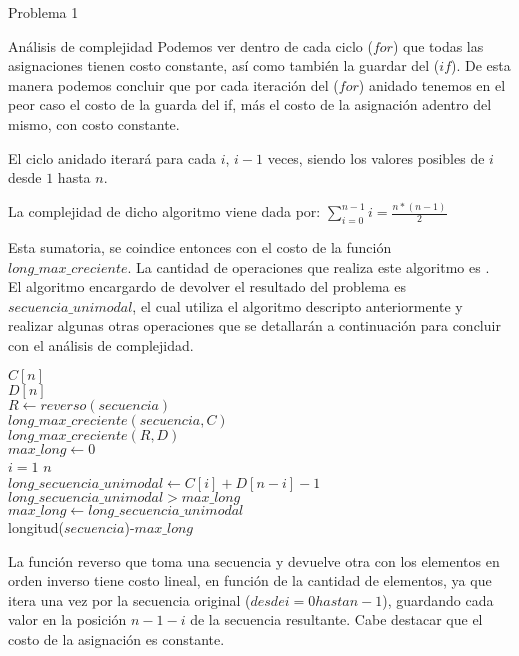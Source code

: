 \begin{section}{Problema 1}
\begin{subsection}{Análisis de complejidad}
		Podemos ver dentro de cada ciclo ($for$) que todas las asignaciones tienen costo constante, así como también la guardar 
		del ($if$). De esta manera podemos concluir que por cada iteración del ($for$) anidado tenemos en el peor caso el costo 
		de la guarda del if, más el costo de la asignación adentro del mismo, con costo constante.

		El ciclo anidado iterará para cada $i$, $i-1$ veces, siendo los valores posibles de $i$ desde $1$ hasta $n$.

		La complejidad de dicho algoritmo viene dada por: $\sum_{i=0}^{n-1} i = \frac{n*(n-1)}{2}$

		Esta sumatoria, se coindice entonces con el costo de la función $long\_max\_creciente$. La cantidad de operaciones que 
		realiza este algoritmo es .\\
	
		El algoritmo encargardo de devolver el resultado del problema es $secuencia\_unimodal$, el cual utiliza el algoritmo 
		descripto anteriormente y realizar algunas otras operaciones que se detallarán a continuación para concluir con el análisis 
		de complejidad.\\
	
		\vspace{0.5cm}
		\begin{pseudo}
			\tab $C[n]$\\
			\tab $D[n]$\\
			\tab $R \leftarrow reverso(secuencia)$ 		 \\
			\tab $long\_max\_creciente(secuencia,C)$ 	\\
			\tab $long\_max\_creciente(R,D)$		\\
			\tab $max\_long \leftarrow 0$			\\
			\tab \FOR $i=1$ \TO $n$				\\
			\tab \tab $long\_secuencia\_unimodal\leftarrow C[i]+D[n-i]-1$ 	\\
			\tab \tab \IF $ long\_secuencia\_unimodal >  max\_long$ 	\\
			\tab \tab \tab $max\_long \leftarrow long\_secuencia\_unimodal$ \\
			\tab \RET longitud($secuencia$)-$max\_long$ 			\\
		\end{pseudo}
		
		La función reverso que toma una secuencia y devuelve otra con los elementos en orden inverso tiene costo lineal, en función 
		de la cantidad de elementos, ya que itera una vez por la secuencia original ($desde i=0 hasta n-1$), guardando cada valor en 
		la posición $n-1-i$ de la secuencia resultante. Cabe destacar que el costo de la asignación es constante.


\end{subsection}
\end{section}
